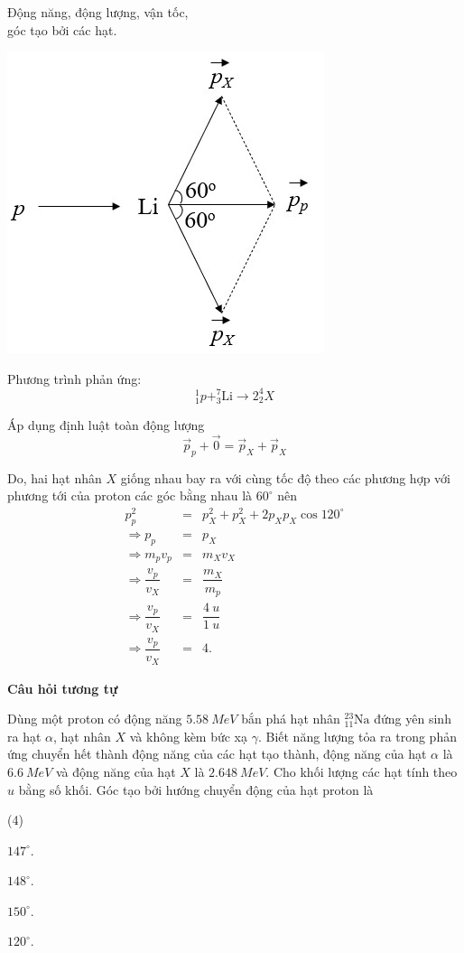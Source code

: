 \begin{dang}{Động năng, động lượng, vận tốc,\\ góc tạo bởi các hạt.}
{		\begin{center}
			\includegraphics[scale=0.8]{../figs/VN12-PH-47-L-028-2-H1.jpg}
		\end{center}
		
		Phương trình phản ứng:
		\begin{equation*}
		^1_1 p + ^7_3\text{Li} \rightarrow 2 ^4_2 X
		\end{equation*}
		
		Áp dụng định luật toàn động lượng
		\begin{equation*}
		\vec{p}_p + \vec{0} = \vec{p}_X + \vec{p}_X
		\end{equation*}
		
		Do, hai hạt nhân $X$ giống nhau bay ra với cùng tốc độ theo các phương hợp với phương tới của proton các góc bằng nhau là $60^\circ$ nên
		\begin{eqnarray*}
		p_p^2 &=& p_X^2 + p_X^2 + 2 p_X p_X \cos 120^\circ\\
		\Rightarrow p_p &=& p_X\\
		\Rightarrow m_p v_p &=& m_X v_X\\
		\Rightarrow \dfrac{v_p}{v_X} &=& \dfrac{m_X}{m_p} \\
		\Rightarrow \dfrac{v_p}{v_X} &=& \dfrac{\SI{4}{u}}{\SI{1}{u}}\\
		\Rightarrow \dfrac{v_p}{v_X} &=& 4.
		\end{eqnarray*}
		
\begin{center}
	\textbf{Câu hỏi tương tự}
\end{center}				
Dùng một proton có động năng $ \SI{5,58}{MeV} $ bắn phá hạt nhân $ ^{23}_{11} \text{Na} $ đứng yên sinh ra hạt $ \alpha $, hạt nhân $ X $ và không kèm bức xạ $ \gamma $. Biết năng lượng tỏa ra trong phản ứng chuyển hết thành động năng của các hạt tạo thành, động năng của hạt $ \alpha $ là $ \SI{6,6}{MeV} $	và động năng của hạt $ X $ là $ \SI{2,648}{MeV} $. Cho khối lượng các hạt tính theo $ u $ bằng số khối. Góc tạo bởi hướng chuyển động của hạt proton là
\begin{mcq}(4)
	\item $ 147^\circ $.
	\item $ 148^\circ $.
	\item $ 150^\circ $.
	\item $ 120^\circ $.
\end{mcq}

}
\end{dang}
